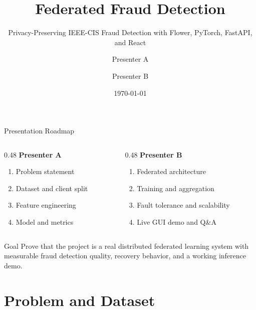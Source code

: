\documentclass[aspectratio=169,10pt]{beamer}
\title[Federated Fraud Detection]{Federated Fraud Detection}
\subtitle{Privacy-Preserving IEEE-CIS Fraud Detection with Flower, PyTorch, FastAPI, and React}
\author{Presenter A \and Presenter B}
\institute{Distributed Systems Project}
\date{\today}
\begin{document}
\begin{frame}
  \titlepage
\end{frame}

\begin{frame}{Presentation Roadmap}
  \begin{columns}[T]
    \begin{column}{0.48\textwidth}
      \textbf{Presenter A}
      \begin{enumerate}
        \item Problem statement
        \item Dataset and client split
        \item Feature engineering
        \item Model and metrics
      \end{enumerate}
    \end{column}
    \begin{column}{0.48\textwidth}
      \textbf{Presenter B}
      \begin{enumerate}
        \item Federated architecture
        \item Training and aggregation
        \item Fault tolerance and scalability
        \item Live GUI demo and Q\&A
      \end{enumerate}
    \end{column}
  \end{columns}
  \vspace{0.4cm}
  \begin{block}{Goal}
    Prove that the project is a real distributed federated learning system with measurable fraud detection quality, recovery behavior, and a working inference demo.
  \end{block}
\end{frame}

\section{Problem and Dataset}
\end{document}
